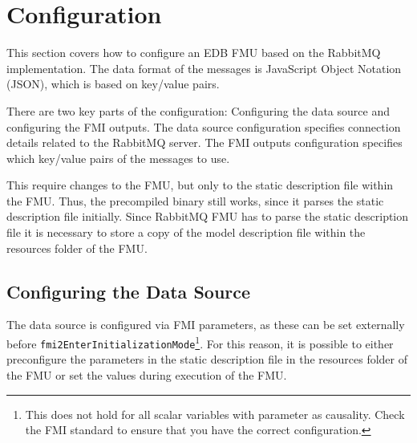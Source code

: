 \section{Configuration}\label{sec:configuration}
This section covers how to configure an EDB FMU based on the RabbitMQ
implementation.
The data format of the messages is JavaScript Object Notation (JSON), which is
based on key/value pairs.

There are two key parts of the configuration: Configuring the data source and
configuring the FMI outputs. The data source configuration specifies connection
details related to the RabbitMQ server.
The FMI outputs configuration specifies which key/value pairs of the messages to
use.

This require changes to the FMU, but only to the static description file within
the FMU. Thus, the precompiled binary still works, since it parses the static
description file initially. Since RabbitMQ FMU has to parse the static
description file it is necessary to store a copy of the model description file
within the resources folder of the FMU.

\subsection{Configuring the Data Source}
The data source is configured via FMI parameters, as these can be set externally
before \texttt{fmi2EnterInitializationMode}\footnote{This does not hold for all
  scalar variables with parameter as causality. Check the FMI standard to ensure that you have the correct configuration.}. For this reason, it is possible to
either preconfigure the parameters in the static description file in the
resources folder of the FMU or set the values during execution of the FMU.

